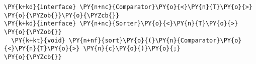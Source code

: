 \begin{Verbatim}[commandchars=\\\{\}]
\PY{k+kd}{interface} \PY{n+nc}{Comparator}\PY{o}{<}\PY{n}{T}\PY{o}{>} \PY{o}{\PYZob{}}\PY{o}{\PYZcb{}}
\PY{k+kd}{interface} \PY{n+nc}{Sorter}\PY{o}{<}\PY{n}{T}\PY{o}{>} \PY{o}{\PYZob{}}
  \PY{k+kt}{void} \PY{n+nf}{sort}\PY{o}{(}\PY{n}{Comparator}\PY{o}{<}\PY{n}{T}\PY{o}{>} \PY{n}{c}\PY{o}{)}\PY{o}{;}
\PY{o}{\PYZcb{}}
\end{Verbatim}
